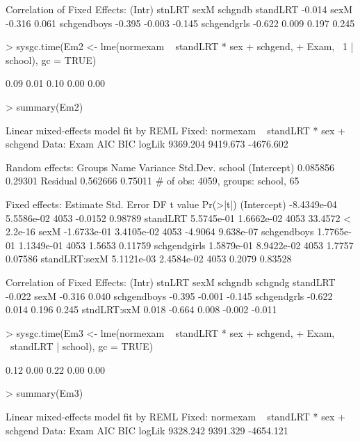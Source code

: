 \documentclass[12pt]{article}
\begin{document}
\begin{Schunk}
\begin{Soutput}
Correlation of Fixed Effects:
            (Intr) stnLRT sexM   schgndb
standLRT    -0.014                      
sexM        -0.316  0.061               
schgendboys -0.395 -0.003 -0.145        
schgendgrls -0.622  0.009  0.197  0.245 
\end{Soutput}
\begin{Sinput}
> sysgc.time(Em2 <- lme(normexam ~ standLRT * sex + schgend, 
+     Exam, ~1 | school), gc = TRUE)
\end{Sinput}
\begin{Soutput}
[1] 0.09 0.01 0.10 0.00 0.00
\end{Soutput}
\begin{Sinput}
> summary(Em2)
\end{Sinput}
\begin{Soutput}
Linear mixed-effects model fit by REML
Fixed: normexam ~ standLRT * sex + schgend 
 Data: Exam 
      AIC      BIC    logLik
 9369.204 9419.673 -4676.602

Random effects:
 Groups   Name        Variance Std.Dev.
 school   (Intercept) 0.085856 0.29301 
 Residual             0.562666 0.75011 
# of obs: 4059, groups: school, 65

Fixed effects:
                 Estimate  Std. Error   DF t value  Pr(>|t|)
(Intercept)   -8.4349e-04  5.5586e-02 4053 -0.0152   0.98789
standLRT       5.5745e-01  1.6662e-02 4053 33.4572 < 2.2e-16
sexM          -1.6733e-01  3.4105e-02 4053 -4.9064 9.638e-07
schgendboys    1.7765e-01  1.1349e-01 4053  1.5653   0.11759
schgendgirls   1.5879e-01  8.9422e-02 4053  1.7757   0.07586
standLRT:sexM  5.1121e-03  2.4584e-02 4053  0.2079   0.83528

Correlation of Fixed Effects:
            (Intr) stnLRT sexM   schgndb schgndg
standLRT    -0.022                              
sexM        -0.316  0.040                       
schgendboys -0.395 -0.001 -0.145                
schgendgrls -0.622  0.014  0.196  0.245         
stndLRT:sxM  0.018 -0.664  0.008 -0.002  -0.011 
\end{Soutput}
\begin{Sinput}
> sysgc.time(Em3 <- lme(normexam ~ standLRT * sex + schgend, 
+     Exam, ~standLRT | school), gc = TRUE)
\end{Sinput}
\begin{Soutput}
[1] 0.12 0.00 0.22 0.00 0.00
\end{Soutput}
\begin{Sinput}
> summary(Em3)
\end{Sinput}
\begin{Soutput}
Linear mixed-effects model fit by REML
Fixed: normexam ~ standLRT * sex + schgend 
 Data: Exam 
      AIC      BIC    logLik
 9328.242 9391.329 -4654.121


\end{Soutput}
\end{Schunk}
\end{document}
